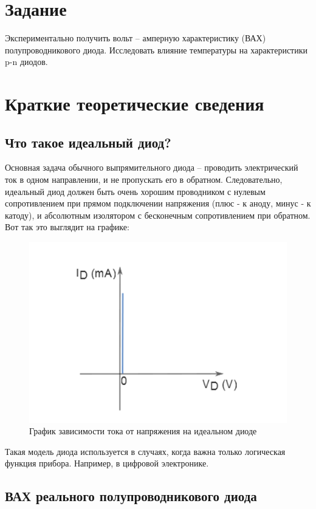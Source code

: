 \documentclass[a4paper,14pt]{article}
\begin{document}

\tableofcontents
\pagebreak

\section{Задание}

Экспериментально получить вольт – амперную характеристику (ВАХ) полупроводникового диода.
Исследовать влияние температуры на характеристики p-n диодов.


\section{Краткие теоретические сведения}

\subsection{Что такое идеальный диод?}
Основная задача обычного выпрямительного диода – проводить электрический ток в одном направлении, и не пропускать его в обратном. 
Следовательно, идеальный диод должен быть очень хорошим проводником с нулевым сопротивлением при прямом подключении напряжения (плюс - к аноду, минус - к катоду), и абсолютным изолятором с бесконечным сопротивлением при обратном.
Вот так это выглядит на графике:

\begin{figure}[H]
	\centering
	\includegraphics[width=0.5\linewidth]{image/intro_001}
	\caption{График зависимости тока от напряжения на идеальном диоде}
	\label{fig:intro001}
\end{figure}

Такая модель диода используется в случаях, когда важна только логическая функция прибора. Например, в цифровой электронике.

\subsection{ВАХ реального полупроводникового диода}
\end{document}
